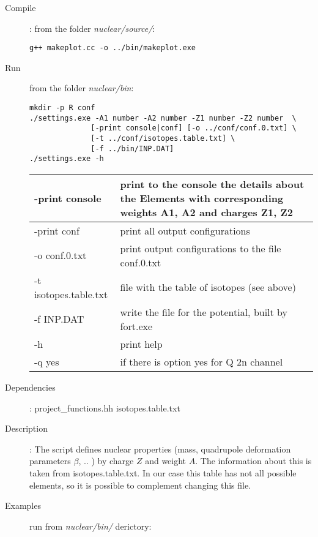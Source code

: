 \documentclass[preprint,review,12pt]{elsarticle}
\begin{document}
    \begin{description}
       \item[Compile]:  from the folder \textit{nuclear/source/}:  
        \begin{verbatim}
g++ makeplot.cc -o ../bin/makeplot.exe

        \end{verbatim}
       \item[Run] from the folder \textit{nuclear/bin}:
        \begin{verbatim}
mkdir -p R conf 
./settings.exe -A1 number -A2 number -Z1 number -Z2 number  \
              [-print console|conf] [-o ../conf/conf.0.txt] \
              [-t ../conf/isotopes.table.txt] \
              [-f ../bin/INP.DAT]
./settings.exe -h
        \end{verbatim}
          \begin{center}
              \begin{tabular}{ | l | p{10cm} |}
              \hline
              -print console   & print to the console the details about the Elements with corresponding weights A1, A2 and charges  Z1, Z2 \\ \hline
              -print conf      & print all output configurations   \\ \hline
              -o conf.0.txt    & print output configurations to the file conf.0.txt \\ \hline
              -t isotopes.table.txt  & file with the table of isotopes (see above) \\ \hline
              -f INP.DAT       & write the file for the potential, built by fort.exe  \\ \hline
              -h               & print help  \\ \hline
              -q yes           & if there is option yes for Q 2n channel  \\ \hline
              \end{tabular}
          \end{center}   
       \item [Dependencies]:
           \subitem   project\_functions.hh
           \subitem   isotopes.table.txt 
       \item [Description]: The script defines nuclear properties (mass, quadrupole deformation parameters $\beta$, .. ) by charge $Z$ and weight $A$. The information about this is taken from isotopes.table.txt. In our case this table has not all possible elements, so it is possible to complement changing this file.
       \item [Examples] run from \textit{nuclear/bin/} derictory:

\end{description}
\end{document}

